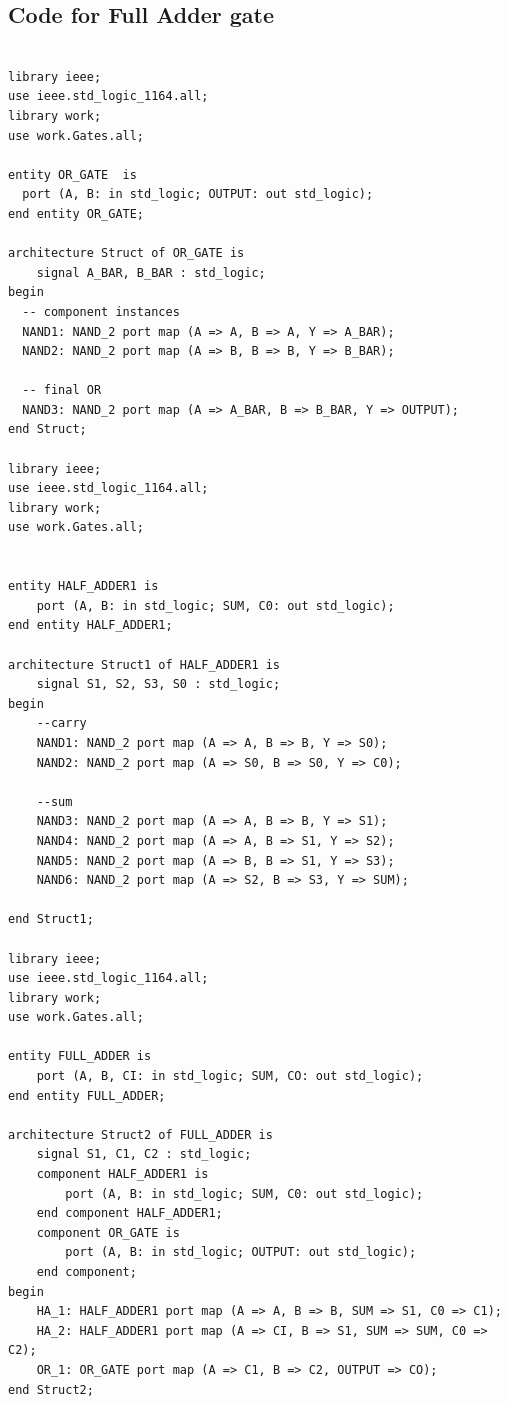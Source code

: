 \documentclass[12pt]{article}
\begin{document}
\subsection{Code for Full Adder gate}
\begin{verbatim}

library ieee;
use ieee.std_logic_1164.all;
library work;
use work.Gates.all;

entity OR_GATE  is
  port (A, B: in std_logic; OUTPUT: out std_logic);
end entity OR_GATE;

architecture Struct of OR_GATE is
	signal A_BAR, B_BAR : std_logic;
begin
  -- component instances
  NAND1: NAND_2 port map (A => A, B => A, Y => A_BAR);
  NAND2: NAND_2 port map (A => B, B => B, Y => B_BAR);
  
  -- final OR
  NAND3: NAND_2 port map (A => A_BAR, B => B_BAR, Y => OUTPUT);
end Struct;

library ieee;
use ieee.std_logic_1164.all;
library work;
use work.Gates.all;


entity HALF_ADDER1 is
	port (A, B: in std_logic; SUM, C0: out std_logic);
end entity HALF_ADDER1;

architecture Struct1 of HALF_ADDER1 is
	signal S1, S2, S3, S0 : std_logic;
begin
	--carry
	NAND1: NAND_2 port map (A => A, B => B, Y => S0);
	NAND2: NAND_2 port map (A => S0, B => S0, Y => C0);
	
	--sum
	NAND3: NAND_2 port map (A => A, B => B, Y => S1);
	NAND4: NAND_2 port map (A => A, B => S1, Y => S2);
	NAND5: NAND_2 port map (A => B, B => S1, Y => S3);
	NAND6: NAND_2 port map (A => S2, B => S3, Y => SUM);

end Struct1;

library ieee;
use ieee.std_logic_1164.all;
library work;
use work.Gates.all;

entity FULL_ADDER is
	port (A, B, CI: in std_logic; SUM, CO: out std_logic);
end entity FULL_ADDER;

architecture Struct2 of FULL_ADDER is
	signal S1, C1, C2 : std_logic;
	component HALF_ADDER1 is
		port (A, B: in std_logic; SUM, C0: out std_logic);
	end component HALF_ADDER1;
	component OR_GATE is
		port (A, B: in std_logic; OUTPUT: out std_logic);
	end component;
begin
	HA_1: HALF_ADDER1 port map (A => A, B => B, SUM => S1, C0 => C1);
	HA_2: HALF_ADDER1 port map (A => CI, B => S1, SUM => SUM, C0 => C2);
	OR_1: OR_GATE port map (A => C1, B => C2, OUTPUT => CO);
end Struct2;

\end{verbatim}
\end{document}
